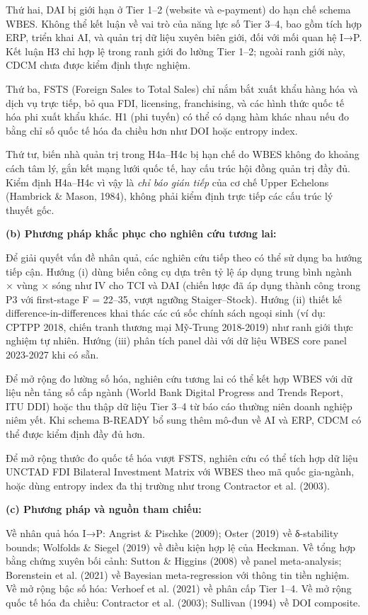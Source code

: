 \documentclass[12pt,a4paper]{article}
\begin{document}
Thứ hai, DAI bị giới hạn ở Tier 1--2 (website và e-payment) do hạn chế
schema WBES. Không thể kết luận về vai trò của năng lực số Tier 3--4,
bao gồm tích hợp ERP, triển khai AI, và quản trị dữ liệu xuyên biên
giới, đối với mối quan hệ I→P. Kết luận H3 chỉ hợp lệ trong ranh giới đo
lường Tier 1--2; ngoài ranh giới này, CDCM chưa được kiểm định thực
nghiệm.

Thứ ba, FSTS (Foreign Sales to Total Sales) chỉ nắm bắt xuất khẩu hàng
hóa và dịch vụ trực tiếp, bỏ qua FDI, licensing, franchising, và các
hình thức quốc tế hóa phi xuất khẩu khác. H1 (phi tuyến) có thể có dạng
hàm khác nhau nếu đo bằng chỉ số quốc tế hóa đa chiều hơn như DOI hoặc
entropy index.

Thứ tư, biến nhà quản trị trong H4a--H4c bị hạn chế do WBES không đo
khoảng cách tâm lý, gắn kết mạng lưới quốc tế, hay cấu trúc hội đồng
quản trị đầy đủ. Kiểm định H4a--H4c vì vậy là \emph{chỉ báo gián tiếp}
của cơ chế Upper Echelons (Hambrick \& Mason, 1984), không phải kiểm
định trực tiếp các cấu trúc lý thuyết gốc.

\textbf{(b) Phương pháp khắc phục cho nghiên cứu tương lai:}

Để giải quyết vấn đề nhân quả, các nghiên cứu tiếp theo có thể sử dụng
ba hướng tiếp cận. Hướng (i) dùng biến công cụ dựa trên tỷ lệ áp dụng
trung bình ngành × vùng × sóng như IV cho TCI và DAI (chiến lược đã áp
dụng thành công trong P3 với first-stage F = 22--35, vượt ngưỡng
Staiger--Stock). Hướng (ii) thiết kế difference-in-differences khai thác
các cú sốc chính sách ngoại sinh (ví dụ: CPTPP 2018, chiến tranh thương
mại Mỹ-Trung 2018-2019) như ranh giới thực nghiệm tự nhiên. Hướng (iii)
phân tích panel dài với dữ liệu WBES core panel 2023-2027 khi có sẵn.

Để mở rộng đo lường số hóa, nghiên cứu tương lai có thể kết hợp WBES với
dữ liệu nền tảng số cấp ngành (World Bank Digital Progress and Trends
Report, ITU DDI) hoặc thu thập dữ liệu Tier 3--4 từ báo cáo thường niên
doanh nghiệp niêm yết. Khi schema B-READY bổ sung thêm mô-đun về AI và
ERP, CDCM có thể được kiểm định đầy đủ hơn.

Để mở rộng thước đo quốc tế hóa vượt FSTS, nghiên cứu có thể tích hợp dữ
liệu UNCTAD FDI Bilateral Investment Matrix với WBES theo mã quốc
gia-ngành, hoặc dùng entropy index đa thị trường như trong Contractor et
al. (2003).

\textbf{(c) Phương pháp và nguồn tham chiếu:}

Về nhân quả hóa I→P: Angrist \& Pischke (2009); Oster (2019) về
δ-stability bounds; Wolfolds \& Siegel (2019) về điều kiện hợp lệ của
Heckman. Về tổng hợp bằng chứng xuyên bối cảnh: Sutton \& Higgins (2008)
về panel meta-analysis; Borenstein et al. (2021) về Bayesian
meta-regression với thông tin tiền nghiệm. Về mở rộng bậc số hóa:
Verhoef et al. (2021) về phân cấp Tier 1--4. Về mở rộng quốc tế hóa đa
chiều: Contractor et al. (2003); Sullivan (1994) về DOI composite.
\end{document}
